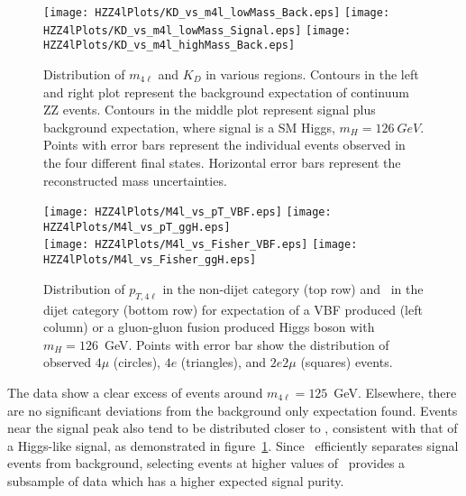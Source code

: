 \begin{figure}
\begin{center}
\texttt{[image: HZZ4lPlots/KD\_vs\_m4l\_lowMass\_Back.eps]}
\texttt{[image: HZZ4lPlots/KD\_vs\_m4l\_lowMass\_Signal.eps]}
\texttt{[image: HZZ4lPlots/KD\_vs\_m4l\_highMass\_Back.eps]}
\caption{
Distribution of $m_{4\ell}$ and $K_D$ in various regions.  
Contours in the left and right plot represent the background 
expectation of continuum ZZ events.  Contours in the middle
plot represent signal plus background expectation, where signal
is a SM Higgs, $m_H=126~GeV$.  Points with error bars represent
the individual events observed in the four different final states.
Horizontal error bars represent the reconstructed mass
uncertainties.
}
\label{fig:HZZ4lMassKDdist}
\end{center}
\end{figure}


\begin{figure}
\begin{center}
\texttt{[image: HZZ4lPlots/M4l\_vs\_pT\_VBF.eps]}
\texttt{[image: HZZ4lPlots/M4l\_vs\_pT\_ggH.eps]}\\
\texttt{[image: HZZ4lPlots/M4l\_vs\_Fisher\_VBF.eps]}
\texttt{[image: HZZ4lPlots/M4l\_vs\_Fisher\_ggH.eps]}
\caption{Distribution of $p_{T,4\ell}$ in the non-dijet category (top row) and 
\Djet~in the dijet category (bottom row) for expectation of a VBF produced (left column) 
or a gluon-gluon fusion produced Higgs boson with $m_H=126$~GeV.
Points with error bar show the distribution of observed $4\mu$ (circles), $4e$ (triangles), 
and $2e2\mu$ (squares) events.}
\label{fig:HZZ4lVBFvars}
\end{center}
\end{figure}

The data show a clear excess of events around $m_{4\ell}=125$~GeV. 
Elsewhere, there are no significant deviations from the 
background only expectation found.  
Events near the signal peak also tend to be distributed closer to 
, consistent with that of a Higgs-like signal, as demonstrated
in figure~\ref{fig:HZZ4lMassKDdist}. 
Since \KD~efficiently separates signal events from background,
selecting events at higher values of \KD~provides a subsample
of data which has a higher expected signal purity.

